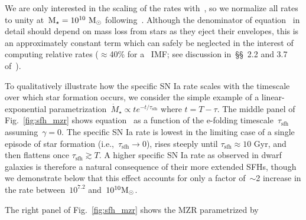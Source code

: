 \documentclass[foo.tex]{subfiles}
\begin{document}
We are only interested in the scaling of the rates with~\mstar, so we normalize
all rates to unity at~$\text{M}_\star = 10^{10}~\text{M}_\odot$ following~\citet{Brown2019}.
Although the denominator of equation~ in detail should depend
on mass loss from stars as they eject their envelopes, this is an approximately
constant term which can safely be neglected in the interest of computing
relative rates ($\approx$40\% for a~\citealt{Kroupa2001} IMF; see discussion
in~\S\S~2.2 and 3.7 of~\citealt*{Weinberg2017}).
\par
To qualitatively illustrate how the specific SN Ia rate scales with the
timescale over which star formation occurs, we consider the simple example of a
linear-exponential
parametrization~$\dot{M}_\star \propto te^{-t/\tau_\text{sfh}}$ where
$t = T - \tau$.
The middle panel of Fig.~\ref{fig:sfh_mzr} shows equation~ as
a function of the e-folding timescale~$\tau_\text{sfh}$ assuming~$\gamma = 0$.
The specific SN Ia rate is lowest in the limiting case of a single episode of
star formation (i.e.,~$\tau_\text{sfh} \rightarrow 0$), rises steeply until
$\tau_\text{sfh} \approx 10$ Gyr, and then flattens once
$\tau_\text{sfh} \gtrsim T$.
A higher specific SN Ia rate as observed in dwarf galaxies is therefore a
natural consequence of their more extended SFHs, though we demonstrate below
that this effect accounts for only a factor of~$\sim$2 increase in the rate
between~$10^{7.2}$ and~$10^{10} \text{M}_\odot$.
\par
The right panel of Fig.~\ref{fig:sfh_mzr} shows the MZR parametrized by
\end{document}
